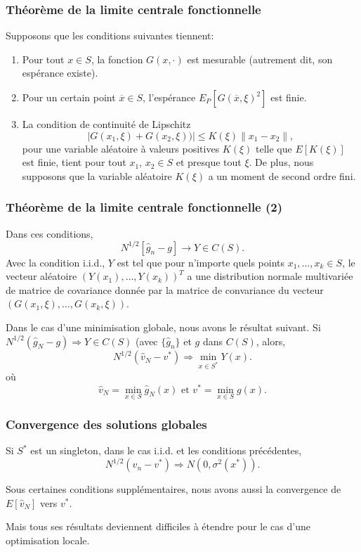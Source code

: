 \documentclass[french]{beamer}
\begin{document}
\begin{frame}
\frametitle{Théorème de la limite centrale fonctionnelle}

Supposons que les conditions suivantes tiennent:
\begin{enumerate}
\item
Pour tout $x \in S$, la fonction $G(x,\cdot)$ est mesurable (autrement
dit, son espérance existe).
\item
Pour un certain point $\overline{x} \in S$, l'espérance
$E_P[G(\overline{x}, \xi)^2]$ est finie.
\item
La condition de continuité de Lipschitz
\[
| G(x_1, \xi) + G(x_2, \xi) )| \leq K(\xi) \| x_1 - x_2\|,
\]
pour une variable aléatoire à valeurs positives $K(\xi)$ telle que
$E[K(\xi)]$ est finie, tient pour tout $x_1$, $x_2 \in S$ et presque
tout $\xi$.
De plus, nous supposons que la variable aléatoire $K(\xi)$ a un moment
de second ordre fini.
\end{enumerate}

\end{frame}

\begin{frame}
\frametitle{Théorème de la limite centrale fonctionnelle (2)}

Dans ces conditions,
\[
N^{1/2} [\hat{g}_n - g] \rightarrow Y \in C(S).
\]
Avec la condition i.i.d., $Y$ est tel que pour n'importe quels points
$x_1,\ldots,x_k \in S$, le vecteur aléatoire
$(Y(x_1),\ldots,Y(x_k))^T$ a une distribution normale multivariée
de matrice de covariance donnée par la matrice de convariance du
vecteur $(G(x_1, \xi), \ldots, G(x_k, \xi))$.

\mbox{}

Dans le cas d'une minimisation globale, nous avons le résultat
suivant.
Si $N^{1/2}(\hat{g}_N - g) \Rightarrow Y \in C(S)$ (avec $\lbrace
\hat{g}_n \rbrace$ et $g$ dans $C(S)$, alors,
\[
N^{1/2}(\hat{v}_N - v^*) \Rightarrow \min_{x \in S^*} Y(x).
\]
où
\[
\hat{v}_N = \min_{x \in S} \hat{g}_N(x) \mbox{ et } v^*= \min_{x \in S} g(x).
\]

\end{frame}

\begin{frame}
\frametitle{Convergence des solutions globales}
Si $S^*$ est un singleton, dans le cas i.i.d. et les conditions
précédentes,
\[
N^{1/2}(\hat{v}_n - v^*) \Rightarrow N(0, \sigma^2(x^*) ).
\]

\mbox{}

Sous certaines conditions supplémentaires, nous avons aussi la
convergence de $E[\hat{v}_N]$ vers $v^*$.

\mbox{}

Mais tous ses résultats deviennent difficiles à étendre pour le cas
d'une optimisation locale.

\end{frame}
\end{document}
